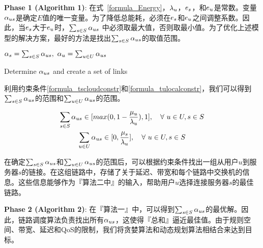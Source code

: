 \textbf{Phase 1 (Algorithm 1)}:
在式~\eqref{formula_Energy}，${\lambda}_{u}$，$e_s$，和$e_u$是常数。变量${\alpha}_{us}$是确定$E$值的唯一变量。为了降低总能耗，必须在$e_s$和$e_u$之间调整系数。因此，当$e_s$大于$e_u$时，$\sum_{s \in S}{{\alpha}_{us}}$ 中必须取最大值，否则取最小值。为了优化上述模型的解决方案，最好的方法是找出$\sum_{s \in S}{\alpha}_{us}$的取值范围。

\begin{algorithm}[h]
\setstretch{\algostretch}
${\alpha}_{s} = \sum_{s \in S}{\alpha}_{us}, \  {\alpha}_{u} = \sum_{u \in U}{\alpha}_{us}$\\
\caption{Determine ${\alpha}_{us}$ and create a set of links}
\label{algo_aus}
\end{algorithm}

利用约束条件\eqref{formula_tscloudconstr}和\eqref{formula_tulocalconstr}，我们可以得到$\sum_{s \in S}{\alpha}_{us}$的范围和$\sum_{u \in U}{\alpha}_{us}$的范围。

\begin{equation*}
\begin{gathered}
\sum_{s \in S}{\alpha}_{us} \in [max(0, 1- \frac{{\mu}_{u}}{{\lambda}_{u}}), 1], \quad \forall\ u \in U, s \in S\\
\sum_{u \in U}{\alpha}_{us} \in [0, \frac{{\mu}_{s}}{{\lambda}_{u}}], \quad \forall\ u \in U, s \in S
\end{gathered}
\end{equation*}

在确定$\sum_{s \in S}{\alpha}_{us}$和$\sum_{u \in U}{\alpha}_{us}$的范围后，可以根据约束条件找出一组从用户$u$到服务器$s$的链接。在这组链路中，存储了关于延迟、带宽和每个链路中交换机的信息。这些信息能够作为『算法二中』的输入，帮助用户$u$选择连接服务器$s$的最佳链路。

\textbf{Phase 2 (Algorithm 2)}:
在『算法一』中，可以得到$\sum_{s \in S}{\alpha}_{us}$的最优解。因此，链路调度算法负责找出所有${\alpha}_{us}$，这使得『总和』逼近最佳值。由于规则空间、带宽、延迟和QoS的限制，我们将贪婪算法和动态规划算法相结合来达到目标。

